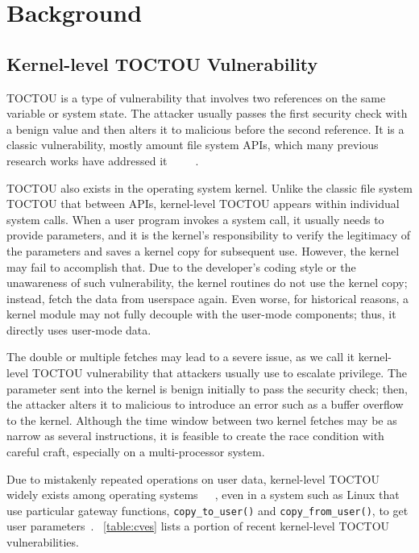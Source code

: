 
\section{Background}
\label{sec:ktoctou-background}



\subsection{Kernel-level TOCTOU Vulnerability}

TOCTOU is a type of vulnerability that involves two references on the same variable or system state. The attacker usually passes the first security check with a benign value and then alters it to malicious before the second reference. It is a classic vulnerability, mostly amount file system APIs, which many previous research works have addressed it~\cite{dean2004fixing}~\cite{borisov2005fixing}~\cite{bishop1996checking}~\cite{bishop1995race}~\cite{wei2005tocttou}.


TOCTOU also exists in the operating system kernel. Unlike the classic file system TOCTOU that between APIs, kernel-level TOCTOU appears within individual system calls. When a user program invokes a system call, it usually needs to provide parameters, and it is the kernel's responsibility to verify the legitimacy of the parameters and saves a kernel copy for subsequent use. However, the kernel may fail to accomplish that. Due to the developer's coding style or the unawareness of such vulnerability, the kernel routines do not use the kernel copy; instead, fetch the data from userspace again. Even worse, for historical reasons, a kernel module may not fully decouple with the user-mode components; thus, it directly uses user-mode data.


The double or multiple fetches may lead to a severe issue, as we call it kernel-level TOCTOU vulnerability that attackers usually use to escalate privilege. The parameter sent into the kernel is benign initially to pass the security check; then, the attacker alters it to malicious to introduce an error such as a buffer overflow to the kernel. Although the time window between two kernel fetches may be as narrow as several instructions, it is feasible to create the race condition with careful craft, especially on a multi-processor system.


Due to mistakenly repeated operations on user data, kernel-level TOCTOU widely exists among operating systems~\cite{watson2007exploiting}~\cite{yang2012concurrency}~\cite{lu2008learning}, even in a system such as Linux that use particular gateway functions, \texttt{copy\_to\_user()} and \texttt{copy\_from\_user()}, to get user parameters~\cite{double-fetch-linux}. ~\autoref{table:cves} lists a portion of recent kernel-level TOCTOU vulnerabilities.

